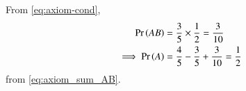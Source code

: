 From \eqref{eq:axiom-cond},
\begin{align}
	\pr{AB}&=\frac{3}{5}\times \frac{1}{2}
=\frac{3}{10} 
\\
\implies
\pr{A}&=\frac{4}{5}-\frac{3}{5}+\frac{3}{10}
=\frac{1}{2}
	\label{eq:exemplar/12/13/3/64}
\end{align}
from \eqref{eq:axiom_sum_AB}.

